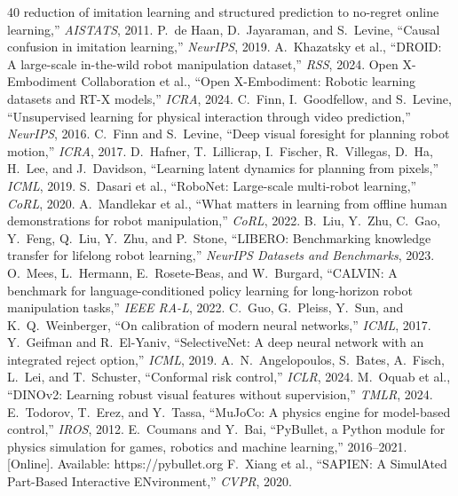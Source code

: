 \documentclass[conference]{IEEEtran}
\begin{document}
\begin{thebibliography}{40}
reduction of imitation learning and structured prediction to no-regret online
learning,'' \emph{AISTATS}, 2011.
 P.~de Haan, D.~Jayaraman, and S.~Levine, ``Causal
confusion in imitation learning,'' \emph{NeurIPS}, 2019.
 A.~Khazatsky et al., ``DROID: A large-scale
in-the-wild robot manipulation dataset,'' \emph{RSS}, 2024.
 Open X-Embodiment Collaboration et al., ``Open
X-Embodiment: Robotic learning datasets and RT-X models,'' \emph{ICRA}, 2024.
 C.~Finn, I.~Goodfellow, and S.~Levine, ``Unsupervised
learning for physical interaction through video prediction,'' \emph{NeurIPS},
2016.
 C.~Finn and S.~Levine, ``Deep visual foresight for
planning robot motion,'' \emph{ICRA}, 2017.
 D.~Hafner, T.~Lillicrap, I.~Fischer, R.~Villegas,
D.~Ha, H.~Lee, and J.~Davidson, ``Learning latent dynamics for planning from
pixels,'' \emph{ICML}, 2019.
 S.~Dasari et al., ``RoboNet: Large-scale
multi-robot learning,'' \emph{CoRL}, 2020.
 A.~Mandlekar et al., ``What matters in
learning from offline human demonstrations for robot manipulation,''
\emph{CoRL}, 2022.
 B.~Liu, Y.~Zhu, C.~Gao, Y.~Feng, Q.~Liu, Y.~Zhu, and
P.~Stone, ``LIBERO: Benchmarking knowledge transfer for lifelong robot
learning,'' \emph{NeurIPS Datasets and Benchmarks}, 2023.
 O.~Mees, L.~Hermann, E.~Rosete-Beas, and W.~Burgard,
``CALVIN: A benchmark for language-conditioned policy learning for long-horizon
robot manipulation tasks,'' \emph{IEEE RA-L}, 2022.
 C.~Guo, G.~Pleiss, Y.~Sun, and K.~Q.~Weinberger,
``On calibration of modern neural networks,'' \emph{ICML}, 2017.
 Y.~Geifman and R.~El-Yaniv, ``SelectiveNet: A
deep neural network with an integrated reject option,'' \emph{ICML}, 2019.
 A.~N.~Angelopoulos, S.~Bates, A.~Fisch, L.~Lei,
and T.~Schuster, ``Conformal risk control,'' \emph{ICLR}, 2024.
 M.~Oquab et al., ``DINOv2: Learning robust visual
features without supervision,'' \emph{TMLR}, 2024.
 E.~Todorov, T.~Erez, and Y.~Tassa, ``MuJoCo: A
physics engine for model-based control,'' \emph{IROS}, 2012.
 E.~Coumans and Y.~Bai, ``PyBullet, a Python
module for physics simulation for games, robotics and machine learning,''
2016--2021. [Online]. Available: https://pybullet.org
 F.~Xiang et al., ``SAPIEN: A SimulAted Part-Based
Interactive ENvironment,'' \emph{CVPR}, 2020.
\end{thebibliography}
\end{document}

